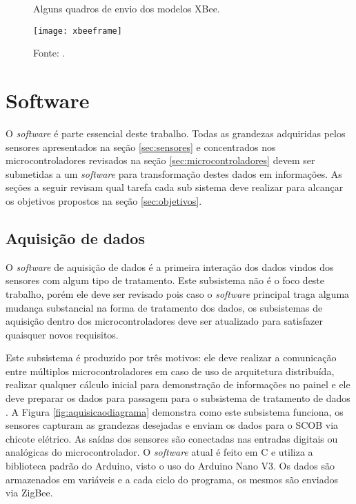 \begin{figure}[!htb]
	\centering
		\caption{Alguns quadros de envio dos modelos XBee.}
		\texttt{[image: xbeeframe]} 
		\caption*{Fonte: \cite{xbeetutorial}.}
		\label{fig:xbeeframe}
\end{figure} 


\section{Software}
\label{sec:software}

O \textit{software} é parte essencial deste trabalho. Todas as grandezas adquiridas pelos sensores apresentados na seção \ref{sec:sensores} e concentrados nos microcontroladores revisados na seção \ref{sec:microcontroladores} devem ser submetidas a um \textit{software} para transformação destes dados em informações. As seções a seguir revisam qual tarefa cada sub sistema deve realizar para alcançar os objetivos propostos na seção \ref{sec:objetivos}.  

\subsection{Aquisição de dados}
\label{sec:aquisicaodedados}

O \textit{software} de aquisição de dados é a primeira interação dos dados vindos dos sensores com algum tipo de tratamento. Este subsistema não é o foco deste trabalho, porém ele deve ser revisado pois caso o \textit{software} principal traga alguma mudança substancial na forma de tratamento dos dados, os subsistemas de aquisição dentro dos microcontroladores deve ser atualizado para satisfazer quaisquer novos requisitos.

Este subsistema é produzido por três motivos: ele deve realizar a comunicação entre múltiplos microcontroladores em caso de uso de arquitetura distribuída, realizar qualquer cálculo inicial para demonstração de informações no painel e ele deve preparar os dados para passagem para o subsistema de tratamento de dados \cite{racecarInstrumentationFor2012}\cite{projetoMiniBaja2006}\cite{designAndImplementation2015}\cite{Dias2010}\cite{Nunes2016}. A Figura \ref{fig:aquisicaodiagrama} demonstra como este subsistema funciona, os sensores capturam as grandezas desejadas e enviam os dados para o SCOB via chicote elétrico. As saídas dos sensores são conectadas nas entradas digitais ou analógicas do microcontrolador. O \textit{software} atual é feito em C e utiliza a biblioteca padrão do Arduino, visto o uso do Arduino Nano V3. Os dados são armazenados em variáveis e a cada ciclo do programa, os mesmos são enviados via ZigBee.      

